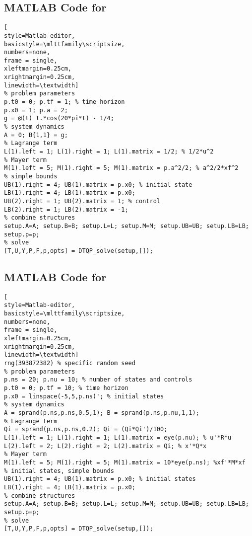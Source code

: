 \subsection{MATLAB Code for } \label{sec:ex3-code}

\begin{lstlisting}[
style=Matlab-editor,
basicstyle=\mlttfamily\scriptsize,
numbers=none,
frame = single, 
xleftmargin=0.25cm,
xrightmargin=0.25cm,
linewidth=\textwidth]
% problem parameters
p.t0 = 0; p.tf = 1; % time horizon
p.x0 = 1; p.a = 2;
g = @(t) t.*cos(20*pi*t) - 1/4;
% system dynamics
A = 0; B{1,1} = g;
% Lagrange term
L(1).left = 1; L(1).right = 1; L(1).matrix = 1/2; % 1/2*u^2
% Mayer term
M(1).left = 5; M(1).right = 5; M(1).matrix = p.a^2/2; % a^2/2*xf^2
% simple bounds
UB(1).right = 4; UB(1).matrix = p.x0; % initial state
LB(1).right = 4; LB(1).matrix = p.x0;
UB(2).right = 1; UB(2).matrix = 1; % control
LB(2).right = 1; LB(2).matrix = -1;
% combine structures
setup.A=A; setup.B=B; setup.L=L; setup.M=M; setup.UB=UB; setup.LB=LB; setup.p=p;
% solve
[T,U,Y,P,F,p,opts] = DTQP_solve(setup,[]);
\end{lstlisting}

\subsection{MATLAB Code for } \label{sec:ex4-code}

\begin{lstlisting}[
style=Matlab-editor,
basicstyle=\mlttfamily\scriptsize,
numbers=none,
frame = single, 
xleftmargin=0.25cm,
xrightmargin=0.25cm,
linewidth=\textwidth]
rng(393872382) % specific random seed
% problem parameters
p.ns = 20; p.nu = 10; % number of states and controls
p.t0 = 0; p.tf = 10; % time horizon
p.x0 = linspace(-5,5,p.ns)'; % initial states
% system dynamics
A = sprand(p.ns,p.ns,0.5,1); B = sprand(p.ns,p.nu,1,1);
% Lagrange term
Qi = sprand(p.ns,p.ns,0.2); Qi = (Qi*Qi')/100;
L(1).left = 1; L(1).right = 1; L(1).matrix = eye(p.nu); % u'*R*u
L(2).left = 2; L(2).right = 2; L(2).matrix = Qi; % x'*Q*x
% Mayer term
M(1).left = 5; M(1).right = 5; M(1).matrix = 10*eye(p.ns); %xf'*M*xf
% initial states, simple bounds
UB(1).right = 4; UB(1).matrix = p.x0; % initial states
LB(1).right = 4; LB(1).matrix = p.x0;
% combine structures
setup.A=A; setup.B=B; setup.L=L; setup.M=M; setup.UB=UB; setup.LB=LB; setup.p=p;
% solve
[T,U,Y,P,F,p,opts] = DTQP_solve(setup,[]);
\end{lstlisting}

